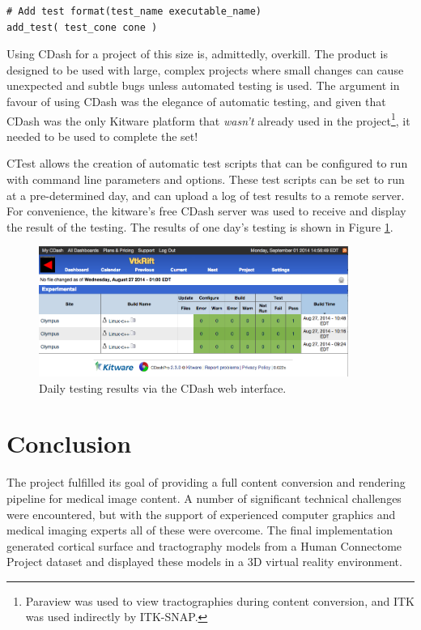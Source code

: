 \documentclass[MSc,paper=a4,pagesize=auto]{icldt}
\begin{document}
\begin{lstlisting}[label=setting_a_test, caption=Configuring a specific test]
# Add test format(test_name executable_name)
add_test( test_cone cone )
\end{lstlisting}

Using CDash for a project of this size is, admittedly, overkill. The product is designed to be used with large, complex projects where small changes can cause unexpected and subtle bugs unless automated testing is used. The argument in favour of using CDash was the elegance of automatic testing, and given that CDash was the only Kitware platform that \textit{wasn't} already used in the project\footnote{Paraview was used to view tractographies during content conversion, and ITK was used indirectly by ITK-SNAP.}, it needed to be used to complete the set!

CTest allows the creation of automatic test scripts that can be configured to run with command line parameters and options. These test scripts can be set to run at a pre-determined day, and can upload a log of test results to a remote server. For convenience, the kitware's free CDash server was used to receive and display the result of the testing. The results of one day's testing is shown in Figure \ref{fig:cdash_testing}. 

\begin{figure}[htbp!]
    \centering
    \includegraphics[width=0.9\textwidth]{resources/cdash_testing}
    \caption{Daily testing results via the CDash web interface.}
    \label{fig:cdash_testing}
\end{figure}

\chapter{Conclusion}
The project fulfilled its goal of providing a full content conversion and rendering pipeline for medical image content. A number of significant technical challenges were encountered, but with the support of experienced computer graphics and medical imaging experts all of these were overcome. The final implementation generated cortical surface and tractography models from a Human Connectome Project dataset and displayed these models in a 3D virtual reality environment. 
\end{document}
